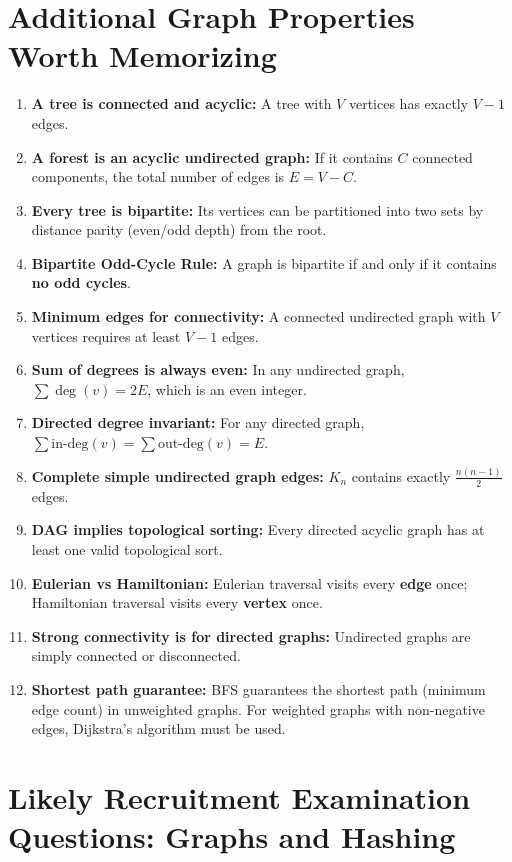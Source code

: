 \section{Additional Graph Properties Worth Memorizing}

\begin{enumerate}
    \item \textbf{A tree is connected and acyclic:} A tree with $V$ vertices has exactly $V - 1$ edges.
    \item \textbf{A forest is an acyclic undirected graph:} If it contains $C$ connected components, the total number of edges is $E = V - C$.
    \item \textbf{Every tree is bipartite:} Its vertices can be partitioned into two sets by distance parity (even/odd depth) from the root.
    \item \textbf{Bipartite Odd-Cycle Rule:} A graph is bipartite if and only if it contains \textbf{no odd cycles}.
    \item \textbf{Minimum edges for connectivity:} A connected undirected graph with $V$ vertices requires at least $V - 1$ edges.
    \item \textbf{Sum of degrees is always even:} In any undirected graph, $\sum \deg(v) = 2E$, which is an even integer.
    \item \textbf{Directed degree invariant:} For any directed graph, $\sum \text{in-deg}(v) = \sum \text{out-deg}(v) = E$.
    \item \textbf{Complete simple undirected graph edges:} $K_n$ contains exactly $\frac{n(n-1)}{2}$ edges.
    \item \textbf{DAG implies topological sorting:} Every directed acyclic graph has at least one valid topological sort.
    \item \textbf{Eulerian vs Hamiltonian:} Eulerian traversal visits every \textbf{edge} once; Hamiltonian traversal visits every \textbf{vertex} once.
    \item \textbf{Strong connectivity is for directed graphs:} Undirected graphs are simply connected or disconnected.
    \item \textbf{Shortest path guarantee:} BFS guarantees the shortest path (minimum edge count) in unweighted graphs. For weighted graphs with non-negative edges, Dijkstra's algorithm must be used.
\end{enumerate}

\section{Likely Recruitment Examination Questions: Graphs and Hashing}

